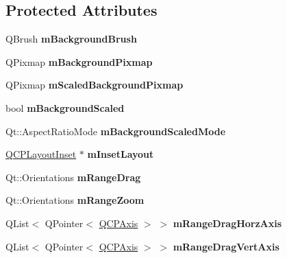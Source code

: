 \subsection*{Protected Attributes}
\begin{DoxyCompactItemize}
\item 
\mbox{\label{classQCPAxisRect_a5748e1a37f63c428e38b0a7724b46259}} 
Q\+Brush {\bfseries m\+Background\+Brush}
\item 
\mbox{\label{classQCPAxisRect_a38fb1a15f43228a0c124553649303722}} 
Q\+Pixmap {\bfseries m\+Background\+Pixmap}
\item 
\mbox{\label{classQCPAxisRect_aa74b9415598d59b49290e41e42d7ee27}} 
Q\+Pixmap {\bfseries m\+Scaled\+Background\+Pixmap}
\item 
\mbox{\label{classQCPAxisRect_a5ad835f0fae5d7cc5ada9e063641dbf1}} 
bool {\bfseries m\+Background\+Scaled}
\item 
\mbox{\label{classQCPAxisRect_a859fd368e794663e346b4f53f35078e9}} 
Qt\+::\+Aspect\+Ratio\+Mode {\bfseries m\+Background\+Scaled\+Mode}
\item 
\mbox{\label{classQCPAxisRect_a255240399e0fd24baad80cbbe46f698a}} 
\hyperlink{classQCPLayoutInset}{Q\+C\+P\+Layout\+Inset} $\ast$ {\bfseries m\+Inset\+Layout}
\item 
\mbox{\label{classQCPAxisRect_aa9f107f66ca3469ad50ee6cea7c9e237}} 
Qt\+::\+Orientations {\bfseries m\+Range\+Drag}
\item 
\mbox{\label{classQCPAxisRect_a215eff671d48df2edccc36e7f976f28c}} 
Qt\+::\+Orientations {\bfseries m\+Range\+Zoom}
\item 
\mbox{\label{classQCPAxisRect_abd4f1d854b41a9c6730f3a3d605c42af}} 
Q\+List$<$ Q\+Pointer$<$ \hyperlink{classQCPAxis}{Q\+C\+P\+Axis} $>$ $>$ {\bfseries m\+Range\+Drag\+Horz\+Axis}
\item 
\mbox{\label{classQCPAxisRect_a3b0a86e5bb136a458d7bc20773e45853}} 
Q\+List$<$ Q\+Pointer$<$ \hyperlink{classQCPAxis}{Q\+C\+P\+Axis} $>$ $>$ {\bfseries m\+Range\+Drag\+Vert\+Axis}

\end{DoxyCompactItemize}
